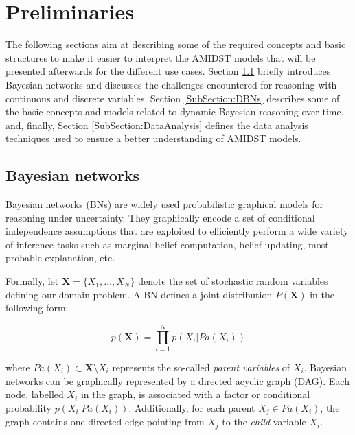 \section{Preliminaries}\label{Section:Preliminaries}

The following sections aim at describing some of the required concepts and basic structures to make it easier to interpret the AMIDST models that will be presented afterwards for the different use cases. Section \ref{SubSection:HybridBNs} briefly introduces Bayesian networks and discusses the challenges encountered for reasoning with continuous and discrete variables, Section \ref{SubSection:DBNs} describes some of the basic concepts and models related to dynamic Bayesian reasoning over time, and, finally, Section \ref{SubSection:DataAnalysis} defines the data analysis techniques used to ensure a better understanding of AMIDST models.

\subsection{Bayesian networks}\label{SubSection:HybridBNs}

Bayesian networks (BNs) \cite{JensenNielsen2007} are widely used probabilistic graphical models for reasoning under uncertainty. They graphically encode a set of conditional independence assumptions that are exploited to efficiently perform a wide variety of inference tasks such as marginal belief computation, belief updating, most probable explanation, etc.  

Formally, let $\bm X = \{X_1,\ldots,X_N\}$ denote the set of stochastic random variables defining our domain problem. A BN defines a joint distribution $P(\bm X)$ in the following form:

$$ p(\bm X) = \prod_{i=1}^N p(X_i|Pa(X_i))$$ 

\noindent where $Pa(X_i)\subset \bm X\setminus X_i$ represents the so-called \emph{parent variables} of $X_i$. Bayesian networks can be graphically represented by a directed acyclic graph (DAG). Each node, labelled $X_i$ in the graph, is associated with a factor or conditional probability $p(X_i|Pa(X_i))$. Additionally, for each parent $X_j \in Pa(X_i)$, the graph contains one directed edge pointing from $X_j$ to the \emph{child} variable $X_i$.

